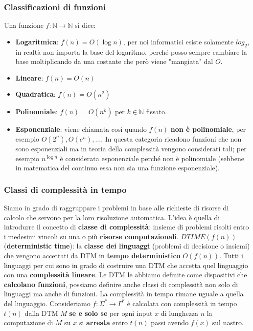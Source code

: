 \documentclass{article}
\begin{document}
\subsubsection{Classificazioni di funzioni}
Una funzione $f:\mathbb{N}\rightarrow\mathbb{N}$ si dice:
\begin{itemize}
    \item \textbf{Logaritmica}: $f(n)=O(\log n)$, per noi informatici esiste solamente $log_2$,
          in realtà non importa la base del logaritmo, perché posso sempre cambiare la base
          moltiplicando da una costante che però viene "mangiata" dal $O$.
    \item \textbf{Lineare}: $f(n)=O(n)$
    \item \textbf{Quadratica}: $f(n)=O(n^2)$
    \item \textbf{Polinomiale}: $f(n)=O(n^k)$ per $k\in\mathbb{N}$ fissato.
    \item \textbf{Esponenziale}: viene chiamata così quando
            $f(n)$ \textbf{non è polinomiale}, per esempio $O(2^n),O(e^n),\dots$. In questa
          categoria ricadono funzioni che non sono esponenziali ma in teoria della complessità
          vengono considerati tali; per esempio $n^{\log n}$ è considerata esponenziale
          perché non è polinomiale (sebbene in matematica del continuo essa non sia una funzione
          esponenziale).
\end{itemize}

\subsubsection{Classi di complessità in tempo}
Siamo in grado di raggruppare i problemi in base alle richieste di risorse di calcolo
che servono per la loro risoluzione automatica. L'idea è quella di introdurre il concetto
di \textbf{classe di complessità}: insieme di problemi risolti entro i medesimi vincoli
su una o più \textbf{risorse computazionali}.\newline\newline
$DTIME(f(n))$ (\textbf{deterministic time}): la \textbf{classe dei linguaggi}
(problemi di decisione o insiemi) che vengono accettati da DTM in \textbf{tempo deterministico}
$O(f(n))$. Tutti i linguaggi per cui sono in grado
di costruire una DTM che accetta quel linguaggio con una \textbf{complessità lineare}.
\newline\newline
Le DTM le abbiamo definite come dispositivi che \textbf{calcolano funzioni}, possiamo definire
anche classi di complessità non solo di linguaggi ma anche di funzioni. La complessità
in tempo rimane uguale a quella del linguaggio.\newline\newline
Consideriamo $f:\Sigma^*\rightarrow\Gamma^*$
è calcolata con complessità in tempo $t(n)$ dalla DTM $M$ \textbf{se e solo se} per ogni input $x$
di lunghezza $n$ la computazione di $M$ su $x$ si \textbf{arresta} entro $t(n)$ passi avendo $f(x)$
sul nastro.
\end{document}
